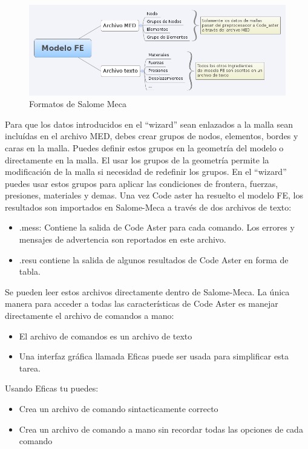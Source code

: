 \documentclass[12pt]{book}
\theoremstyle{definition}
\theoremstyle{remark}
\theoremstyle{plain}
\begin{document}
\begin{figure}
\centering
\includegraphics[width=5.5in]{ModeloFE.png}
\caption{Formatos de Salome Meca}
\label{fig3}
\end{figure}

Para que los datos introducidos en el ``wizard'' sean enlazados a la malla sean 
incluídas en el archivo MED, debes crear grupos de nodos, elementos, bordes y caras 
en la malla. Puedes definir estos grupos en la geometría del modelo o directamente 
en la malla. El usar los grupos de la geometría permite la modificación de la malla
si necesidad de redefinir los grupos. En el ``wizard'' puedes usar estos grupos para
aplicar las condiciones de frontera, fuerzas, presiones, materiales y demas.
Una vez Code aster ha resuelto el modelo FE, los resultados son importados en 
Salome-Meca a través de dos archivos de texto:

\begin{itemize}
 \item .mess: Contiene la salida de Code Aster para cada comando. Los errores y mensajes de advertencia son reportados en este archivo.
\item .resu contiene la salida de algunos resultados de Code Aster en forma de tabla.
\end{itemize}
Se pueden leer estos archivos directamente dentro de Salome-Meca.
La única manera para acceder a todas las características de Code Aster es manejar 
directamente el archivo de comandos a mano:

\begin{itemize}
 \item El archivo de comandos es un archivo de texto
 \item Una interfaz gráfica llamada Eficas puede ser usada para simplificar esta tarea.
\end{itemize}

Usando Eficas tu puedes:

\begin{itemize}
 \item Crea un archivo de comando sintacticamente correcto
 \item Crea un archivo de comando a mano sin recordar todas las opciones de cada comando
\end{itemize}
\end{document}
